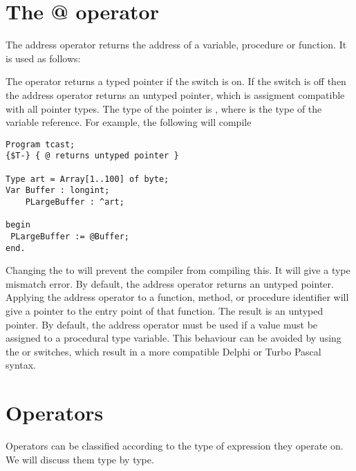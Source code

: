 \section{The @ operator}
The address operator  returns the address of a variable, procedure
or function. It is used as follows:

The  operator returns a typed pointer if the  switch is on.
If the  switch is off then the address operator returns an untyped
pointer, which is assigment compatible with all pointer types. The type of
the pointer is , where  is the type of the variable
reference.
For example, the following will compile
\begin{verbatim}
Program tcast;
{$T-} { @ returns untyped pointer }

Type art = Array[1..100] of byte;
Var Buffer : longint;
    PLargeBuffer : ^art;

begin
 PLargeBuffer := @Buffer;
end.
\end{verbatim}
Changing the  to  will prevent the compiler from
compiling this. It will give a type mismatch error.
By default, the address operator returns an untyped pointer.
Applying the address operator to a function, method, or procedure identifier
will give a pointer to the entry point of that function. The result is an
untyped pointer.
By default, the address operator must be used if a value must be assigned
to a procedural type variable. This behaviour can be avoided by using the
 or  switches, which result in a more compatible Delphi or
Turbo Pascal syntax.

\section{Operators}
Operators can be classified according to the type of expression they
operate on. We will discuss them type by type.
